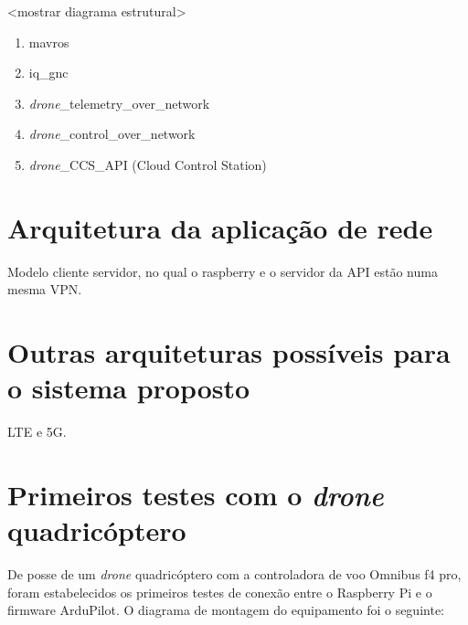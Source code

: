 \documentclass[12pt,a4paper,oneside]{book}
\begin{document}
<mostrar diagrama estrutural>

\begin{enumerate}
  \item mavros 
  \item iq\_gnc
  \item \textit{drone}\_telemetry\_over\_network
  \item \textit{drone}\_control\_over\_network
  \item \textit{drone}\_CCS\_API (Cloud Control Station)
\end{enumerate}

\section{Arquitetura da aplicação de rede}

Modelo cliente servidor, no qual o raspberry e o servidor da API estão numa mesma VPN. 

\section{Outras arquiteturas possíveis para o sistema proposto}

LTE e 5G.

\section{Primeiros testes com o \textit{drone} quadricóptero}

De posse de um \textit{drone} quadricóptero com a controladora de voo Omnibus f4 pro, foram estabelecidos os primeiros testes de conexão entre o Raspberry Pi e o firmware ArduPilot. O diagrama de montagem do equipamento foi o seguinte:
\end{document}
